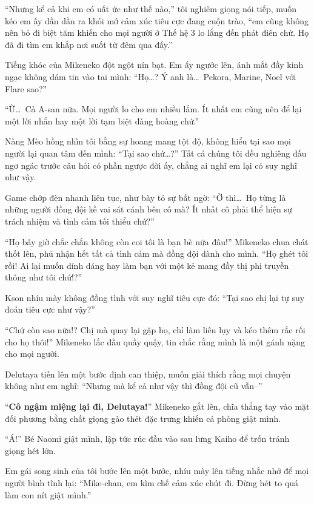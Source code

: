 ﻿\documentclass[../main.tex]{subfiles}
\begin{document}
``Nhưng kể cả khi em có uất ức như thế nào,'' tôi nghiêm giọng nói tiếp, muốn kéo em ấy dần dần ra khỏi mớ cảm xúc tiêu cực đang cuộn trào, ``em cũng không nên bỏ đi biệt tăm khiến cho mọi người ở Thế hệ 3 lo lắng đến phát điên chứ. Họ đã đi tìm em khắp nơi suốt từ đêm qua đấy.''

Tiếng khóc của Mikeneko đột ngột nín bạt. Em ấy ngước lên, ánh mắt đầy kinh ngạc không dám tin vào tai mình: ``Họ\dots? Ý anh là\dots\ Pekora, Marine, Noel với Flare sao?''

``Ừ\dots\ Cả A-san nữa. Mọi người lo cho em nhiều lắm. Ít nhất em cũng nên để lại một lời nhắn hay một lời tạm biệt đàng hoàng chứ.''

Nàng Mèo hồng nhìn tôi bằng sự hoang mang tột độ, không hiểu tại sao mọi người lại quan tâm đến mình: ``Tại sao chứ\dots?'' Tất cả chúng tôi đều nghiêng đầu ngơ ngác trước câu hỏi có phần ngược đời ấy, chẳng ai nghĩ em lại có suy nghĩ như vậy.

Game chớp đèn nhanh liên tục, như bày tỏ sự bất ngờ: ``Ờ thì\dots\ Họ từng là những người đồng đội kề vai sát cánh bên cô mà? Ít nhất cô phải thể hiện sự trách nhiệm và tình cảm tối thiểu chứ?''

``Họ bây giờ chắc chắn không còn coi tôi là bạn bè nữa đâu!'' Mikeneko chua chát thốt lên, phủ nhận hết tất cả tình cảm mà đồng đội dành cho mình. ``Họ ghét tôi rồi! Ai lại muốn dính dáng hay làm bạn với một kẻ mang đầy thị phi truyền thông như tôi chứ!?''

Kson nhíu mày không đồng tình với suy nghĩ tiêu cực đó: ``Tại sao chị lại tự suy đoán tiêu cực như vậy?''

``Chứ còn sao nữa!? Chị mà quay lại gặp họ, chỉ làm liên lụy và kéo thêm rắc rối cho họ thôi!'' Mikeneko lắc đầu quầy quậy, tin chắc rằng mình là một gánh nặng cho mọi người.

Delutaya tiến lên một bước định can thiệp, muốn giải thích rằng mọi chuyện không như em nghĩ: ``Nhưng mà kể cả như vậy thì đồng đội cũ vẫn--''

``\textbf{Cô ngậm miệng lại đi, Delutaya!}'' Mikeneko gắt lên, chĩa thẳng tay vào mặt đối phương bằng chất giọng gào thét đặc trưng khiến cả phòng giật mình.

``Á!'' Bé Naomi giật mình, lập tức rúc đầu vào sau lưng Kaiho để trốn tránh giọng hét lớn.

Em gái song sinh của tôi bước lên một bước, nhíu mày lên tiếng nhắc nhở để mọi người bình tĩnh lại: ``Mike-chan, em kìm chế cảm xúc chút đi. Đừng hét to quá làm con nít giật mình.''
\end{document}
